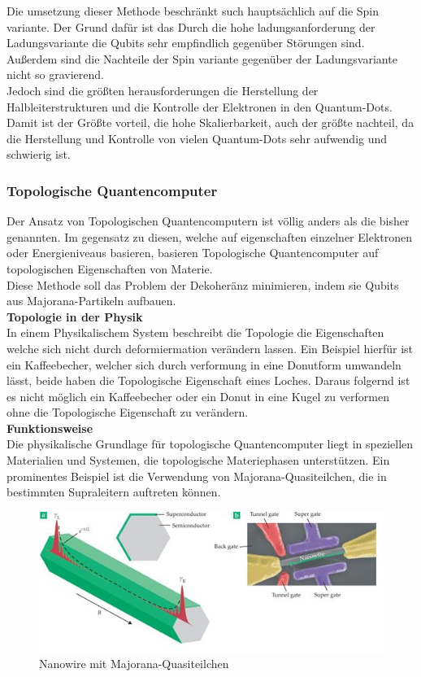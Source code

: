 Die umsetzung dieser Methode beschränkt such hauptsächlich auf die Spin variante. Der Grund dafür ist das Durch die hohe ladungsanforderung der Ladungsvariante die Qubits sehr empfindlich gegenüber Störungen sind.
Außerdem sind die Nachteile der Spin variante gegenüber der Ladungsvariante nicht so gravierend.\\
Jedoch sind die größten herausforderungen die Herstellung der Halbleiterstrukturen und die Kontrolle der Elektronen in den Quantum-Dots.
Damit ist der Größte vorteil, die hohe Skalierbarkeit, auch der größte nachteil, da die Herstellung und Kontrolle von vielen Quantum-Dots sehr aufwendig und schwierig ist.\\

\subsubsection{Topologische Quantencomputer}
\label{subsub:topologische_quantencomputer}
Der Ansatz von Topologischen Quantencomputern ist völlig anders als die bisher genannten. Im gegensatz zu diesen, welche auf eigenschaften einzelner Elektronen oder Energieniveaus basieren, basieren Topologische Quantencomputer auf topologischen Eigenschaften von Materie.\\
Diese Methode soll das Problem der Dekoheränz minimieren, indem sie Qubits aus Majorana-Partikeln aufbauen.\\

\textbf{Topologie in der Physik}\\
In einem Physikalischem System beschreibt die Topologie die Eigenschaften welche sich nicht durch deformiermation verändern lassen.
Ein Beispiel hierfür ist ein Kaffeebecher, welcher sich durch verformung in eine Donutform umwandeln lässt, beide haben die Topologische Eigenschaft eines Loches.
Daraus folgernd ist es nicht möglich ein Kaffeebecher oder ein Donut in eine Kugel zu verformen ohne die Topologische Eigenschaft zu verändern.\\

\textbf{Funktionsweise}\\
Die physikalische Grundlage für topologische Quantencomputer liegt in speziellen Materialien und Systemen, die topologische Materiephasen unterstützen.
Ein prominentes Beispiel ist die Verwendung von Majorana-Quasiteilchen, die in bestimmten Supraleitern auftreten können.\\

\begin{figure}[H]
    \centering
    \includegraphics[width=0.75\linewidth]{img/Majorana.png}
    \caption{Nanowire mit Majorana-Quasiteilchen}
    \label{fig:Majorana}
\end{figure}

